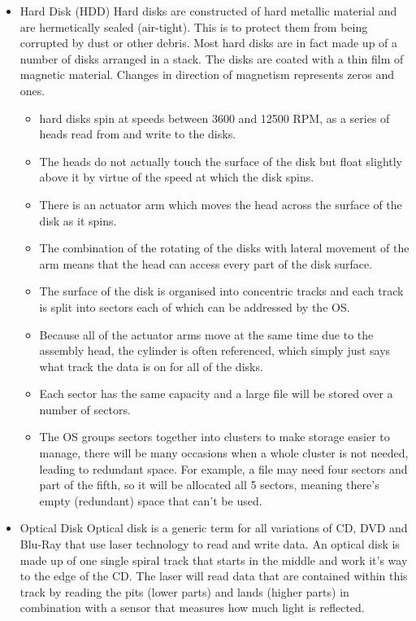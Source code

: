   \begin{itemize}
    \setlength{\itemsep}{0em}
    \item Hard Disk (HDD)
      \subitem Hard disks are constructed of hard metallic material and are hermetically sealed (air-tight). This is to protect them from being corrupted by dust or other debris. Most hard disks are in fact made up of a number of disks arranged in a stack. The disks are coated with a thin film of magnetic material. Changes in direction of magnetism represents zeros and ones.
      \begin{itemize}
        \item hard disks spin at speeds between 3600 and 12500 RPM, as a series of heads read from and write to the disks.
        \item The heads do not actually touch the surface of the disk but float slightly above it by virtue of the speed at which the disk spins.
        \item There is an actuator arm which moves the head across the surface of the disk as it spins.
        \item The combination of the rotating of the disks with lateral movement of the arm means that the head can access every part of the disk surface.
        \item The surface of the disk is organised into concentric tracks and each track is split into sectors each of which can be addressed by the OS.
        \item Because all of the actuator arms move at the same time due to the assembly head, the cylinder is often referenced, which simply just says what track the data is on for all of the disks.
        \item Each sector has the same capacity and a large file will be stored over a number of sectors.
        \item The OS groups sectors together into clusters to make storage easier to manage, there will be many occasions when a whole cluster is not needed, leading to redundant space.
          \subitem For example, a file may need four sectors and part of the fifth, so it will be allocated all 5 sectors, meaning there's empty (redundant) space that can't be used.
      \end{itemize}
    \item Optical Disk
      \subitem Optical disk is a generic term for all variations of CD, DVD and Blu-Ray that use laser technology to read and write data. An optical disk is made up of one single spiral track that starts in the middle and work it's way to the edge of the CD. The laser will read data that are contained within this track by reading the pits (lower parts) and lands (higher parts) in combination with a sensor that measures how much light is reflected.

\end{itemize}
